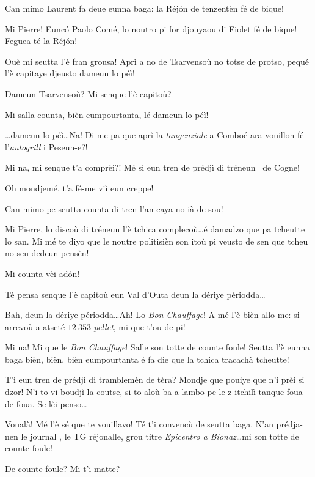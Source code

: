 \begin{drama}
\Pierrespeaks Can mimo Laurent fa deue eunna baga: la Réj\'on de tenzentèn fé de bique!

\Laurentspeaks Mi Pierre! Eunc\'o Paolo Comé, lo noutro pi for djou\-yaou di Fiolet fé de bique! Feguea-té la Réj\'on!

\Pierrespeaks Ouè mi seutta l'è fran grousa! Aprì a no de Tsarvensoù no totse de protso, pequé l'è capitaye djeusto dameun lo péì!

\Laurentspeaks Dameun Tsarvensoù? Mi senque l'è capitoù?

\Pierrespeaks Mi salla counta, bièn eumpourtanta, lé dameun lo péì!

\Laurentspeaks \ldots dameun lo péì\ldots Na! Di-me pa que aprì la \textit{tangenziale} a Comboé ara vouillon fé l'\textit{autogrill} i Peseun-e?!

\Pierrespeaks Mi na, mi senque t'a comprèi?! Mé si eun tren de prédjì di tréneun \tren\ de Cogne!

\Laurentspeaks Oh mondjemé, t'a fé-me viì eun creppe!

\Pierrespeaks Can mimo pe seutta counta di tren l'an caya-no ià de sou! 

\Laurentspeaks Mi Pierre, lo discoù di tréneun l'è tchica complecoù\ldots é damadzo que pa tcheutte lo san. Mi mé te diyo que le noutre politisièn son itoù pi veusto de sen que tcheu no seu dedeun pensèn! 

\Pierrespeaks Mi counta vèi ad\'on!

\Laurentspeaks Té pensa senque l'è capitoù eun Val d'Outa deun la dériye périodda\ldots

\Pierrespeaks Bah, deun la dériye périodda\ldots Ah! Lo \textit{Bon Chauffage}! A mé l'è bièn allo-me: si arrevoù a atseté $12\ 353$ \textit{pellet}, mi que t'ou de pi!

\Laurentspeaks Mi na! Mi que le \textit{Bon Chauffage}! Salle son totte de counte foule! Seutta l'è eunna baga bièn, bièn, bièn eumpourtanta é fa die que la tchica tracachà tcheutte!

\Pierrespeaks T'i eun tren de prédjì di tramblemèn de tèra? Mondje que pouiye que n'i prèi si dzor! N'i to vi boudjì la coutse, si to aloù ba a lambo pe le-z-itchilì tanque foua de foua. Se lèi penso\ldots

\Laurentspeaks Voualà! Mé l'è sé que te vouillavo! Té t'i convencù de seutta baga. N'an prédja-nen le journal \journal , le TG réjonalle, grou titre \og \textit{Epicentro a Bionaz}\fg\ldots mi son totte de counte foule!

\Pierrespeaks De counte foule? Mi t'i matte?


\end{drama}

